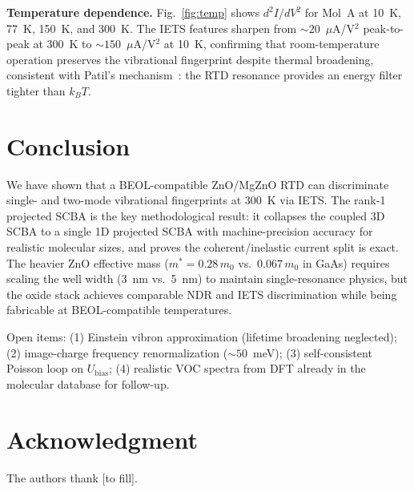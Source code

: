 \documentclass[conference]{IEEEtran}
\begin{document}
\textbf{Temperature dependence.} Fig.~\ref{fig:temp} shows $d^2I/dV^2$
for Mol~A at 10~K, 77~K, 150~K, and 300~K. The IETS features sharpen
from $\sim 20$~$\mu$A/V$^2$ peak-to-peak at 300~K to $\sim 150$~$\mu$A/V$^2$
at 10~K, confirming that room-temperature operation preserves the
vibrational fingerprint despite thermal broadening, consistent with
Patil's mechanism~\cite{patil2018}: the RTD resonance provides an energy
filter tighter than $k_BT$.

\section{Conclusion}

We have shown that a BEOL-compatible ZnO/MgZnO RTD can discriminate
single- and two-mode vibrational fingerprints at 300~K via IETS. The
rank-1 projected SCBA is the key methodological result: it collapses
the coupled 3D SCBA to a single 1D projected SCBA with machine-precision
accuracy for realistic molecular sizes, and proves the
coherent/inelastic current split is exact. The heavier ZnO effective
mass ($m^* = 0.28\,m_0$ vs.\ $0.067\,m_0$ in GaAs) requires scaling
the well width (3~nm vs.\ 5~nm) to maintain single-resonance physics,
but the oxide stack achieves comparable NDR and IETS discrimination
while being fabricable at BEOL-compatible temperatures.

Open items: (1) Einstein vibron approximation (lifetime broadening
neglected); (2) image-charge frequency renormalization ($\sim 50$~meV);
(3) self-consistent Poisson loop on $U_{\mathrm{bias}}$; (4) realistic
VOC spectra from DFT already in the molecular database for follow-up.

\section*{Acknowledgment}
The authors thank [to fill].


\end{document}
